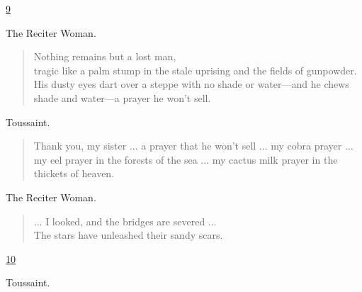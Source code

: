 \documentclass[letterpaper,article,12pt,oneside,notitlepage]{memoir}
\begin{document}
\clearpage

\href{http://cesaire.elotroalex.com/chiens/chiens/p009.html}{9}

\begin{center}The Reciter Woman.\end{center}

\begin{verse}
\hspace{1cm} Nothing remains but a lost man, \\
tragic like a palm stump in the stale uprising and the fields of gunpowder. His dusty eyes dart over a steppe with no shade or water---and he chews shade and water---a prayer he won't sell. \\
\end{verse}

\begin{center}Toussaint.\end{center}

\begin{verse}
\indent Thank you, my sister ... a prayer that he won't sell ... my cobra prayer ... my eel prayer in the forests of the sea ... my cactus milk prayer in the thickets of heaven. \\
\end{verse}

\begin{center}The Reciter Woman.\end{center}

\begin{verse}
\hspace{1cm} ... I looked, and the bridges are severed ... \\
The stars have unleashed their sandy scars. \\
\end{verse}

\clearpage

\href{http://cesaire.elotroalex.com/chiens/chiens/p010.html}{10}

\begin{center}Toussaint.\end{center}
\end{document}
